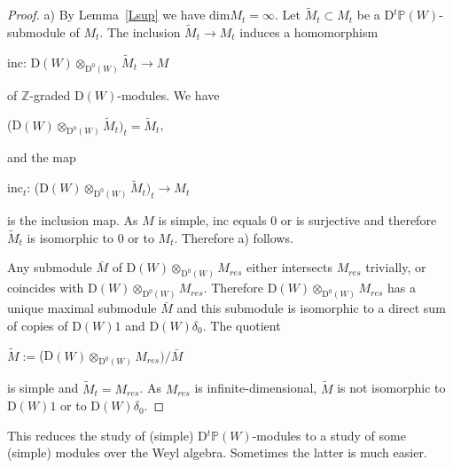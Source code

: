 \documentclass[12pt]{amsart}
\theoremstyle{definition}\newtheorem{theorem}{Theorem}[section]
\theoremstyle{definition}\newtheorem{definition}[proposition]{Definition}
\theoremstyle{remark}\newtheorem{example}[proposition]{Example}
\renewcommand{\to}[1][]{\xrightarrow{#1}}
\begin{document}
\begin{proof}a) By Lemma~\ref{Lsup} we have dim$M_t=\infty$. Let $\tilde M_t\subset M_t$ be a D$^t\mathbb P(W)$-submodule of $M_t$. The inclusion $\tilde M_t\to M_t$ induces a homomorphism \begin{center}inc: D$(W)\otimes_{\mathrm D^0(W)}\tilde M_t\to M$\end{center} of $\mathbb Z$-graded D$(W)$-modules. We have \begin{center}(D$(W)\otimes_{\mathrm D^0(W)}\tilde M_t)_t=\tilde M_t$,\end{center}and the map\begin{center}inc$_t$: (D$(W)\otimes_{\mathrm D^0(W)}\tilde M_t)_t\to M_t$\end{center} is the inclusion map. As $M$ is simple,  inc equals 0 or is surjective and therefore $\tilde M_t$ is isomorphic to 0 or to $M_t$. Therefore a) follows.

Any submodule $\bar M$ of D$(W)\otimes_{\mathrm D^0(W)}M_{res}$ either intersects $M_{res}$ trivially, or coincides with D$(W)\otimes_{\mathrm D^0(W)}M_{res}$. Therefore D$(W)\otimes_{\mathrm D^0(W)}M_{res}$ has a unique maximal submodule $\bar M$ and this submodule is isomorphic to a direct sum of copies of D$(W)1$ and D$(W)\delta_0$. The quotient \begin{center}$\tilde M:=$(D$(W)\otimes_{\mathrm D^0(W)}M_{res})/\bar M$\end{center} is simple and $\tilde M_t=M_{res}$. As $M_{res}$ is infinite-dimensional, $\tilde M$ is not isomorphic to D$(W)1$ or to D$(W)\delta_0$.\end{proof}
This reduces the study of (simple) D$^t\mathbb P(W)$-modules to a study of some (simple) modules over the Weyl algebra. Sometimes the latter is much easier.
\end{document}
